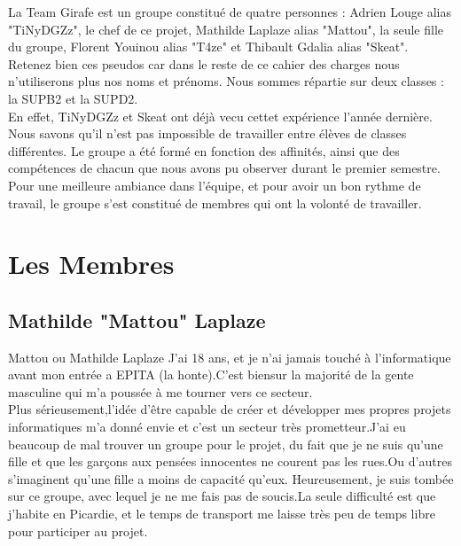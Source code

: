\documentclass [11pt]{report}
\begin{document}
		La Team Girafe est  un groupe constitué de quatre personnes : Adrien Louge alias "TiNyDGZz", le chef de ce projet, Mathilde Laplaze alias "Mattou", la seule fille du groupe, Florent Youinou alias "T4ze" et Thibault Gdalia alias "Skeat". Retenez bien ces pseudos car dans le reste de ce cahier des charges nous n'utiliserons plus nos 		noms et pr\'enoms. Nous sommes r\'epartie sur deux classes : la SUPB2 et la SUPD2. \\
		\indent En effet, TiNyDGZz et Skeat ont déjà vecu cettet expérience l'année dernière. Nous savons qu'il n'est pas impossible de travailler entre \'el\`eves de classes diff\'erentes. Le groupe a \'et\'e form\'e en fonction des affinit\'es, ainsi que des comp\'etences de chacun que nous avons pu observer durant le premier semestre. 		Pour une meilleure ambiance dans l'\'equipe, et pour avoir un bon rythme de travail, le groupe s'est constitué de membres qui ont la volont\'e de travailler. 
	
	
	
	\newpage

	\section { Les Membres }
		\subsection {Mathilde "Mattou" Laplaze}
			Mattou ou Mathilde Laplaze J'ai 18 ans, et je n'ai jamais touché à l'informatique avant mon entrée a EPITA (la honte).C'est biensur la majorité de la gente masculine qui m'a poussée à me tourner vers ce secteur.\\
			\indent Plus sérieusement,l'idée d'être capable de créer et développer mes propres projets informatiques m'a donné envie et c'est un secteur très prometteur.J'ai eu beaucoup de mal trouver un groupe pour le projet, du fait que je ne suis qu'une fille et que les garçons aux pensées innocentes ne courent pas les rues.Ou 			d'autres s'imaginent qu'une fille a moins de capacité qu'eux. Heureusement, je suis tombée sur ce groupe, avec lequel je ne me fais pas de soucis.La seule difficulté est que j'habite en Picardie, et le temps de transport me laisse très peu de temps libre pour participer au projet.\\\vspace{10mm}
	
		
\end{document}
